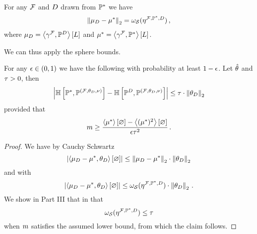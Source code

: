 
\begin{lemma}
    \label{lem:meanParamDistance}
    For any $\mathcal{F}$ and $D$ drawn from $\mathbb{P}^*$ we have
    \begin{align*}
        \left\|\mu_{D} - \mu^*\right\|_{2}
        = \omega_{\mathcal{S}}(\eta^{\mathcal{F},\mathbb{P}^*,D}) \, ,
    \end{align*}
    where $\mu_{D}=\left\langle \gamma^{\mathcal{F}},\mathbb{P}^{D}\right\rangle \left[ L \right]$ and $\mu^*=\left\langle \gamma^{\mathcal{F}},\mathbb{P}^*\right\rangle \left[ L \right]$.
\end{lemma}

%
We can thus apply the sphere bounds.


\begin{theorem}
    For any $\epsilon\in(0,1)$ we have the following with probability at least $1-\epsilon$.
    Let $\hat{\theta}$ and $\tau>0$, then
    \[ \left|\mathbb{H}\left[\mathbb{P}^*,\mathbb{P}^{(\mathcal{F},\theta_{D},\nu)}\right] - \mathbb{H}\left[\mathbb{P}^{D},\mathbb{P}^{(\mathcal{F},\theta_{D},\nu)}\right]\right| \leq \tau \cdot \left\|\theta_{D}\right\|_{2} \]
    provided that
    \[ m \geq \frac{\left\langle \mu^*\right\rangle \left[ \varnothing \right]-\left\langle (\mu^*)^2\right\rangle \left[ \varnothing \right]}{\epsilon \tau^2} \, . \]
\end{theorem}
\begin{proof}
    We have by Cauchy Schwartz
    \[ \left|\left\langle \mu_{D} - \mu^*,\theta_{D}\right\rangle \left[ \varnothing \right]\right| \leq \left\|\mu_{D} - \mu^*\right\|_{2} \cdot \left\|\theta_{D}\right\|_{2}\]
    and with 
    \[ \left|\left\langle \mu_{D} - \mu^*,\theta_{D}\right\rangle \left[ \varnothing \right]\right| \leq \omega_{\mathcal{S}}(\eta^{\mathcal{F},\mathbb{P}^*,D}) \cdot \left\|\theta_{D}\right\|_{2} \, . \]
    We show in Part III that in  that
    \[  \omega_{\mathcal{S}}(\eta^{\mathcal{F},\mathbb{P}^*,D}) \leq \tau \]
    when $m$ satisfies the assumed lower bound, from which the claim follows.
\end{proof}

















